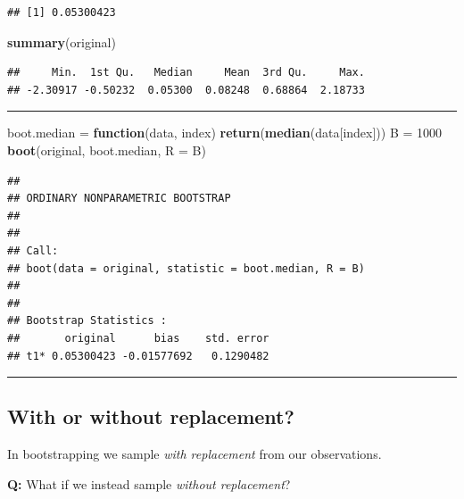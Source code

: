 \documentclass[]{article}
\newenvironment{Shaded}{\begin{snugshade}}{\end{snugshade}}
\newcommand{\ControlFlowTok}[1]{\textcolor[rgb]{0.13,0.29,0.53}{\textbf{#1}}}
\newcommand{\DataTypeTok}[1]{\textcolor[rgb]{0.13,0.29,0.53}{#1}}
\newcommand{\DecValTok}[1]{\textcolor[rgb]{0.00,0.00,0.81}{#1}}
\newcommand{\KeywordTok}[1]{\textcolor[rgb]{0.13,0.29,0.53}{\textbf{#1}}}
\newcommand{\NormalTok}[1]{#1}
\newcommand{\StringTok}[1]{\textcolor[rgb]{0.31,0.60,0.02}{#1}}
\begin{document}
\begin{verbatim}
## [1] 0.05300423
\end{verbatim}

\begin{Shaded}
\begin{Highlighting}[]
\KeywordTok{summary}\NormalTok{(original)}
\end{Highlighting}
\end{Shaded}

\begin{verbatim}
##     Min.  1st Qu.   Median     Mean  3rd Qu.     Max. 
## -2.30917 -0.50232  0.05300  0.08248  0.68864  2.18733
\end{verbatim}

\begin{center}\rule{0.5\linewidth}{\linethickness}\end{center}

\begin{Shaded}
\begin{Highlighting}[]
\NormalTok{boot.median =}\StringTok{ }\ControlFlowTok{function}\NormalTok{(data, index) }\KeywordTok{return}\NormalTok{(}\KeywordTok{median}\NormalTok{(data[index]))}
\NormalTok{B =}\StringTok{ }\DecValTok{1000}
\KeywordTok{boot}\NormalTok{(original, boot.median, }\DataTypeTok{R =}\NormalTok{ B)}
\end{Highlighting}
\end{Shaded}

\begin{verbatim}
## 
## ORDINARY NONPARAMETRIC BOOTSTRAP
## 
## 
## Call:
## boot(data = original, statistic = boot.median, R = B)
## 
## 
## Bootstrap Statistics :
##       original      bias    std. error
## t1* 0.05300423 -0.01577692   0.1290482
\end{verbatim}

\begin{center}\rule{0.5\linewidth}{\linethickness}\end{center}

\hypertarget{with-or-without-replacement}{%
\subsection{With or without
replacement?}\label{with-or-without-replacement}}

In bootstrapping we sample \emph{with replacement} from our
observations.

\textbf{Q:} What if we instead sample \emph{without replacement}?
\end{document}
